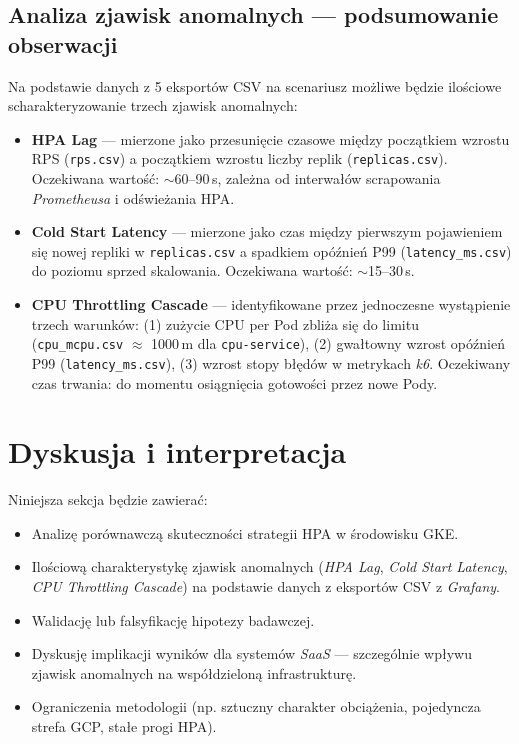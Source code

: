 \subsection{Analiza zjawisk anomalnych — podsumowanie obserwacji}


Na podstawie danych z 5 eksportów CSV na scenariusz możliwe będzie ilościowe scharakteryzowanie trzech zjawisk anomalnych:

\begin{itemize}
  \item \textbf{HPA Lag} — mierzone jako przesunięcie czasowe między początkiem wzrostu RPS (\texttt{rps.csv}) a początkiem wzrostu liczby replik (\texttt{replicas.csv}). Oczekiwana wartość: $\sim$60--90\,s, zależna od interwałów scrapowania \textit{Prometheusa} i odświeżania HPA.

  \item \textbf{Cold Start Latency} — mierzone jako czas między pierwszym pojawieniem się nowej repliki w \texttt{replicas.csv} a spadkiem opóźnień P99 (\texttt{latency\_ms.csv}) do poziomu sprzed skalowania. Oczekiwana wartość: $\sim$15--30\,s.

  \item \textbf{CPU Throttling Cascade} — identyfikowane przez jednoczesne wystąpienie trzech warunków: (1) zużycie CPU per Pod zbliża się do limitu (\texttt{cpu\_mcpu.csv} $\approx$ 1000\,m dla \texttt{cpu-service}), (2) gwałtowny wzrost opóźnień P99 (\texttt{latency\_ms.csv}), (3) wzrost stopy błędów w metrykach \textit{k6}. Oczekiwany czas trwania: do momentu osiągnięcia gotowości przez nowe Pody.
\end{itemize}

\section{Dyskusja i interpretacja}


Niniejsza sekcja będzie zawierać:
\begin{itemize}
  \item Analizę porównawczą skuteczności strategii HPA w środowisku GKE.
  \item Ilościową charakterystykę zjawisk anomalnych (\textit{HPA Lag}, \textit{Cold Start Latency}, \textit{CPU Throttling Cascade}) na podstawie danych z eksportów CSV z \textit{Grafany}.
  \item Walidację lub falsyfikację hipotezy badawczej.
  \item Dyskusję implikacji wyników dla systemów \textit{SaaS} — szczególnie wpływu zjawisk anomalnych na współdzieloną infrastrukturę.
  \item Ograniczenia metodologii (np. sztuczny charakter obciążenia, pojedyncza strefa GCP, stałe progi HPA).
\end{itemize}

